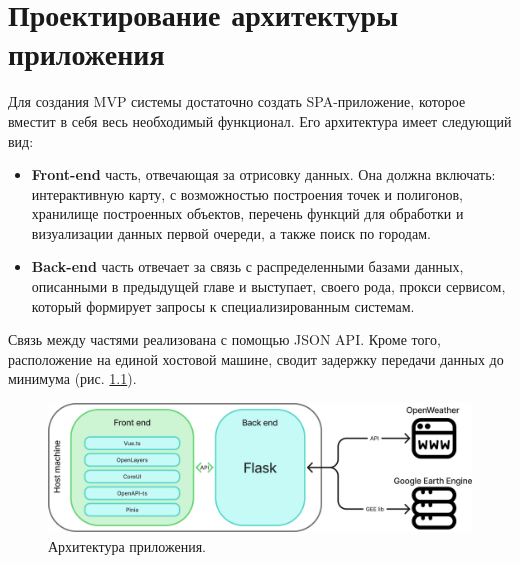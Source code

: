 \chapter{Проектирование архитектуры приложения}
Для создания MVP системы достаточно создать SPA-приложение, которое вместит в себя весь необходимый функционал.
Его архитектура имеет следующий вид:
\begin{itemize}
	\item \textbf{Front-end} часть, отвечающая за отрисовку данных. Она должна включать: интерактивную карту, с возможностью построения точек и полигонов, хранилище построенных объектов, перечень функций для обработки и визуализации данных первой очереди, а также поиск по городам.
	\item \textbf{Back-end} часть отвечает за связь с распределенными базами данных, описанными в предыдущей главе и выступает, своего рода, прокси сервисом, который формирует запросы к специализированным системам.
\end{itemize}

Связь между частями реализована с помощью JSON API. Кроме того, расположение на единой хостовой машине, сводит задержку передачи данных до минимума (рис. \ref{fig:archecture}).

\begin{figure}[h]  %
	\centering
	\includegraphics[height=0.3\textwidth]{imgs/arch.png}  %
	\caption{Архитектура приложения.}  %
	\label{fig:archecture}  %
\end{figure}
